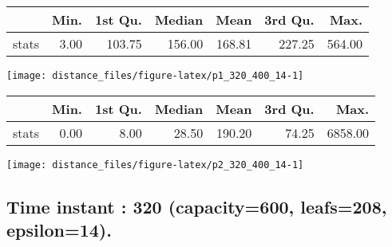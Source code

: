 \documentclass[
  9pt,
  landscape]{article}
\begin{document}
\begin{minipage}{0.5\textwidth} 
\centering 
\begin{tabular}{rrrrrrr}
  \hline
 & Min. & 1st Qu. & Median & Mean & 3rd Qu. & Max. \\ 
  \hline
stats & 3.00 & 103.75 & 156.00 & 168.81 & 227.25 & 564.00 \\ 
   \hline
\end{tabular}
\vspace{0.5cm} 


\texttt{[image: distance\_files/figure-latex/p1\_320\_400\_14-1]} 

\end{minipage} 
\begin{minipage}{0.5\textwidth} 
\centering 
\begin{tabular}{rrrrrrr}
  \hline
 & Min. & 1st Qu. & Median & Mean & 3rd Qu. & Max. \\ 
  \hline
stats & 0.00 & 8.00 & 28.50 & 190.20 & 74.25 & 6858.00 \\ 
   \hline
\end{tabular}
\vspace{0.5cm} 


\texttt{[image: distance\_files/figure-latex/p2\_320\_400\_14-1]} 

\end{minipage}

\pagebreak

\hypertarget{time-instant-320-capacity600-leafs208-epsilon14.}{%
\subsection{Time instant : 320 (capacity=600, leafs=208,
epsilon=14).}\label{time-instant-320-capacity600-leafs208-epsilon14.}}
\end{document}
